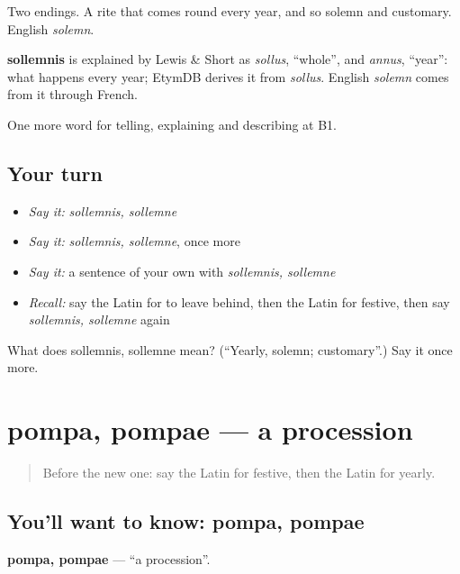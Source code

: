 Two endings. A rite that comes round every year, and so solemn and customary. English \emph{solemn}.

\begin{cousinweb}
\textbf{sollemnis} is explained by Lewis \& Short as \emph{sollus}, \textquotedblleft{}whole\textquotedblright{}, and \emph{annus}, \textquotedblleft{}year\textquotedblright{}: what happens every year; EtymDB derives it from \emph{sollus}. English \emph{solemn} comes from it through French.
\end{cousinweb}

\begin{grammarlens}[title={What you've built}]
One more word for telling, explaining and describing at B1.
\end{grammarlens}

\subsection*{Your turn}
\begin{itemize}
\raggedright
  \item \emph{Say it:} \emph{sollemnis, sollemne}
  \item \emph{Say it:} \emph{sollemnis, sollemne}, once more
  \item \emph{Say it:} a sentence of your own with \emph{sollemnis, sollemne}
  \item \emph{Recall:} say the Latin for to leave behind, then the Latin for festive, then say \emph{sollemnis, sollemne} again
\end{itemize}

\begin{tcolorbox}[breakable,colback=teal!4,colframe=teal!35!black,title={Before you move on}]
What does sollemnis, sollemne mean? (\textquotedblleft{}Yearly, solemn; customary\textquotedblright{}.) Say it once more.
\end{tcolorbox}
\section[pompa, pompae]{pompa, pompae — a procession}

\label{lesson:LA-C333-pompa}



\begin{quote}
Before the new one: say the Latin for festive, then the Latin for yearly.
\end{quote}

\subsection*{You'll want to know: pompa, pompae}
\textbf{pompa, pompae} — \textquotedblleft{}a procession\textquotedblright{}.

